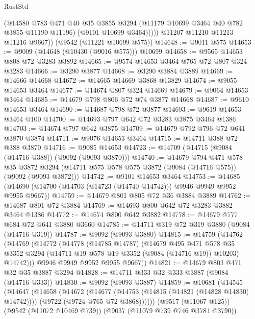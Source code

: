 \begin{lexlean}{RustStd}
\begin{coremodule}
              (@14580
                @783
                @471
                @40
                @35
                @3855
                @3294
                (@11179 @10699 @3464 @40 @782 @3855 @11190 @11196)
                (@9101 @10699 @3464)))))
        @11207
        @11210
        @11213
        @11216
        @9667))
    (@9542 (@11221 @10699 @575))
@14648 := @9011 @575
@14653 := @9009 (@14648 (@10430 (@9016 @575))) @10699
@14658 := @9565 @14653 @808 @72 @3283 @3892
@14665 := @9574 @14653 @3464 @765 @72 @807 @324 @3283
@14666 := @3290 @3877
@14668 := @3290 @3884 @3889
@14669 := @14666 @14668
@14672 := @14665 @14669 @3868 @13829
@14674 := @9055 @14653 @3464
@14677 := @14674 @807 @324 @14669
@14679 := @9064 @14653 @3464
@14685 := @14679 @798 @806 @72 @74 @3877 @14668
@14687 := @9610 @14653 @3464
@14690 := @14687 @798 @72 @3877
@14693 := @9619 @14653 @3464 @100
@14700 := @14693 @797 @642 @72 @3283 @3875 @3464 @1386
@14703 := @14674 @797 @642 @3875
@14709 := @14679 @792 @796 @72 @641 @3870 @3874
@14711 := @9076 @14653 @3464
@14715 := @14711 @388 @72 @388 @3870
@14716 := @9085 @14653
@14723 := @14709 (@14715 (@9084 (@14716 @388)) (@9092 (@9093 @3870)))
@14740 := @14679
    @794
    @471
    @578
    @35
    @3872
    @3294
    (@14711 @575 @578 @575 @3872 (@9084 (@14716 @575)) (@9092 (@9093 @3872)))
@14742 := @9101 @14653 @3464
@14753 := @14685 (@14690 (@14700 (@14703 (@14723 (@14740 @14742))) @9946 @9949 @9952 @9955 @9667))
@14759 := @14679 @801 @805 @72 @36 @3884 @3889
@14762 := @14687 @801 @72 @3884
@14769 := @14693 @800 @642 @72 @3283 @3882 @3464 @1386
@14772 := @14674 @800 @642 @3882
@14778 := @14679 @777 @684 @72 @641 @3880 @3660
@14785 := @14711 @319 @72 @319 @3880 (@9084 (@14716 @319))
@14787 := @9092 (@9093 @3880)
@14815 := @14759
    (@14762
      (@14769
        (@14772
          (@14778
            (@14785 @14787)
            (@14679
              @495
              @471
              @578
              @35
              @3352
              @3294
              (@14711 @19 @578 @19 @3352 (@9084 (@14716 @19)) @10203)
              @14742)))
        @9946
        @9949
        @9952
        @9955
        @9667))
@14821 := @14679 @803 @471 @32 @35 @3887 @3294
@14828 := @14711 @333 @32 @333 @3887 (@9084 (@14716 @333))
@14830 := @9092 (@9093 @3887)
@14859 := @10681
    (@14545
      (@14647
        (@14658
          (@14672
            (@14677 (@14753 (@14815 (@14821 (@14828 @14830) @14742))))
            (@9722 (@9724 @765 @72 @3868))))))
    (@9517 (@11067 @125))
    (@9542 (@11072 @10469 @739))
    (@9037 (@11079 @739 @746 @3781 @3790))

\end{coremodule}
\end{lexlean}
